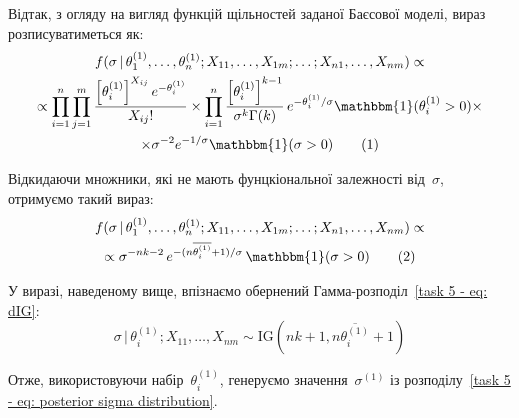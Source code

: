 \begin{enumerate}
        Відтак, з огляду на вигляд функцій щільностей заданої Баєсової моделі, вираз розписуватиметься як:
        \begin{multline*}
            f(\sigma \,|\, \theta_1^{(1)},\ldots,\theta_n^{(1)}; X_{11},\ldots,X_{1m};\ldots;X_{n1},\ldots,X_{nm}) \propto \\
            \propto \prod_{i=1}^{n} \prod_{j=1}^{m} \frac{\left[ \theta_i^{(1)} \right]^{X_{ij}} e^{-\theta_i^{(1)}}}{X_{ij}!} \times \prod_{i=1}^{n} \frac{\left[ \theta_i^{(1)} \right]^{k-1}}{\sigma^{k}\Gamma(k)}\, e^{-\theta_i^{(1)}/\sigma} \mathbbm{1}(\theta_i^{(1)}>0) \times \\ 
            \times \sigma^{-2}e^{-1/\sigma} \mathbbm{1}(\sigma>0) \stepcounter{equation}\tag{\theequation}
        \end{multline*}
       
        Відкидаючи множники, які не мають фунцкіональної залежності від~$\sigma$, отримуємо такий вираз:
        \begin{multline*}
            f(\sigma \,|\, \theta_1^{(1)},\ldots,\theta_n^{(1)}; X_{11},\ldots,X_{1m};\ldots;X_{n1},\ldots,X_{nm}) \propto \\
            \propto \sigma^{-nk-2}\, e^{-(n\overline{\theta_i^{(1)}} + 1)/\sigma}\, \mathbbm{1}(\sigma>0) \stepcounter{equation}\tag{\theequation}
        \end{multline*}

        У виразі, наведеному вище, впізнаємо обернений Гамма-розподіл~\eqref{task 5 - eq: dIG}:
        \begin{equation}\label{task 5 - eq: posterior sigma distribution}
            \sigma \,|\, \theta_i^{(1)}; X_{11},\ldots,X_{nm} \sim \mathrm{IG}\left( nk+1, n\overline{\theta_i^{(1)}} + 1 \right)
        \end{equation}

        Отже, використовуючи набір~$\theta_i^{(1)}$, генеруємо значення~$\sigma^{(1)}$ із розподілу~\eqref{task 5 - eq: posterior sigma distribution}.
\end{enumerate}
